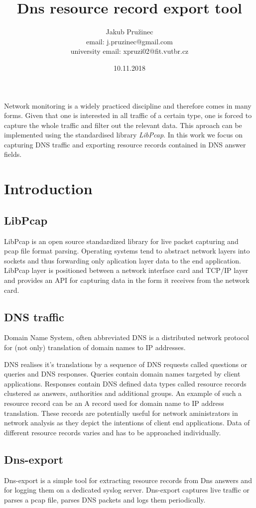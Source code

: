 \documentclass[a4paper, 12pt]{article}
\title{Dns resource record export tool}
\author{Jakub Pružinec \\
        email: j.pruzinec@gmail.com \\
        university email: xpruzi02@fit.vutbr.cz}
\date{10.11.2018}
\begin{document}
\maketitle

\abstract
{
Network monitoring is a widely practiced discipline and therefore comes in many forms. Given that one is interested in all traffic of a certain type, one is forced to capture the whole traffic and filter out the relevant data. This aproach can be implemented using the standardised library \textit{LibPcap}. In this work we focus on capturing DNS traffic and exporting resource records contained in DNS answer fields.
}

\section{Introduction}
\subsection{LibPcap}
LibPcap is an open source standardized library for live packet capturing and pcap file format parsing. Operating systems tend to abstract network layers into sockets and thus forwarding only aplication layer data to the end application. LibPcap layer is positioned between a network interface card and TCP/IP layer and provides an API for capturing data in the form it receives from the network card.

\subsection{DNS traffic}
Domain Name System, often abbreviated DNS is a distributed network protocol for (not only) translation of domain names to IP addresses.

DNS realises it's translations by a sequence of DNS requests called questions or queries and DNS responses. Queries contain domain names targeted by client applications. Responses contain DNS defined data types called resource records clustered as answers, authorities and additional groups. An example of such a resource record can be an A record used for domain name to IP address translation. These records are potentially useful for network aministrators in network analysis as they depict the intentions of client end applications. Data of different resource records varies and has to be approached individually.

\subsection{Dns-export}
Dns-export is a simple tool for extracting resource records from Dns answers and for logging them on a dedicated syslog server. Dns-export captures live traffic or parses a pcap file, parses DNS packets and logs them periodically.
\end{document}
